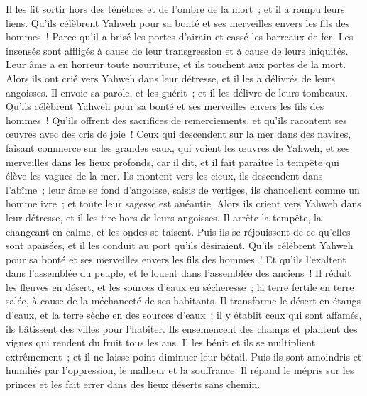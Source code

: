 \begin{multicols}{2}
Il les fit sortir hors des ténèbres et de l'ombre de la mort~; et il a rompu leurs liens.
Qu'ils célèbrent Yahweh pour sa bonté et ses merveilles envers les fils des hommes~!
Parce qu'il a brisé les portes d'airain et cassé les barreaux de fer.
Les insensés sont affligés à cause de leur transgression et à cause de leurs iniquités.
Leur âme a en horreur toute nourriture, et ils touchent aux portes de la mort.
Alors ils ont crié vers Yahweh dans leur détresse, et il les a délivrés de leurs angoisses.
Il envoie sa parole, et les guérit~; et il les délivre de leurs tombeaux.
Qu'ils célèbrent Yahweh pour sa bonté et ses merveilles envers les fils des hommes~!
Qu'ils offrent des sacrifices de remerciements, et qu'ils racontent ses œuvres avec des cris de joie~!
Ceux qui descendent sur la mer dans des navires, faisant commerce sur les grandes eaux,
qui voient les œuvres de Yahweh, et ses merveilles dans les lieux profonds,
car il dit, et il fait paraître la tempête qui élève les vagues de la mer.
Ils montent vers les cieux, ils descendent dans l'abîme~; leur âme se fond d'angoisse,
saisis de vertiges, ils chancellent comme un homme ivre~; et toute leur sagesse est anéantie.
Alors ils crient vers Yahweh dans leur détresse, et il les tire hors de leurs angoisses.
Il arrête la tempête, la changeant en calme, et les ondes se taisent.
Puis ils se réjouissent de ce qu'elles sont apaisées, et il les conduit au port qu'ils désiraient.
Qu'ils célèbrent Yahweh pour sa bonté et ses merveilles envers les fils des hommes~!
Et qu'ils l'exaltent dans l'assemblée du peuple, et le louent dans l'assemblée des anciens~!
Il réduit les fleuves en désert, et les sources d'eaux en sécheresse~;
la terre fertile en terre salée, à cause de la méchanceté de ses habitants.
Il transforme le désert en étangs d'eaux, et la terre sèche en des sources d'eaux~;
il y établit ceux qui sont affamés, ils bâtissent des villes pour l'habiter.
Ils ensemencent des champs et plantent des vignes qui rendent du fruit tous les ans.
Il les bénit et ils se multiplient extrêmement~; et il ne laisse point diminuer leur bétail.
Puis ils sont amoindris et humiliés par l'oppression, le malheur et la souffrance.
Il répand le mépris sur les princes et les fait errer dans des lieux déserts sans chemin.

\end{multicols}
